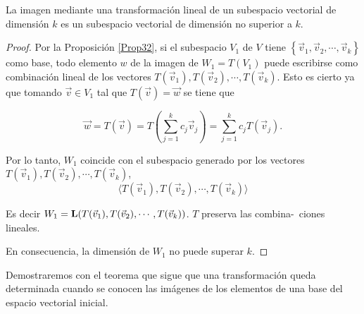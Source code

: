 \bigskip



\bigskip


\begin{theorem}
\label{Prop34}

La imagen mediante una transformación lineal de un subespacio vectorial de dimensión $k$ es un subespacio vectorial de dimensión no superior a $k$.

\begin{proof}
Por la Proposición  \ref{Prop32}, si el subespacio $V_1$ de $V$ tiene $\left\{\vec{v}_1,\vec{v}_2,\cdots, \vec{v}_k\right\}$ como base, todo elemento $w$ de la imagen de $W_1=T(V_1)$ puede escribirse como combinación lineal de los vectores $T(\vec{v}_1),T(\vec{v}_2),\cdots, T(\vec{v}_k)$.  Esto es cierto ya que tomando $\vec{v}\in V_1$  tal que $T(\vec{v})=\vec{w}$ se tiene que 

$$\vec{w}=T(\vec{v})=T(\sum_{j=1}^{k}c_j\vec{v}_j)=\sum_{j=1}^{k}c_jT(\vec{v}_j).$$


Por lo tanto,  $W_1$ coincide con el subespacio generado por los vectores $T(\vec{v}_1),T(\vec{v}_2),\cdots, T(\vec{v}_k)$,
$$  \langle T(\vec{v}_1),T(\vec{v}_2),\cdots, T(\vec{v}_k)   \rangle$$

Es decir $W_1=\bold{L}(T(\vec{v}_1),T(\vec{v}_2),\cdots, T(\vec{v}_k))$.  $T$ preserva las combina-\ ciones lineales.

En consecuencia, la dimensión de $W_1$ no puede superar $k$.


\end{proof}







\end{theorem}

\bigskip

\bigskip

Demostraremos con el teorema que sigue  que una transformación queda determinada cuando se conocen las imágenes de los elementos de una base del espacio vectorial inicial.

